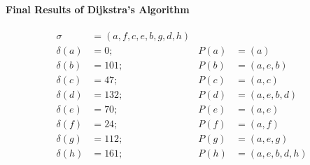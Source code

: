 \documentclass[10pt,]{book}
\theoremstyle{plain}
\theoremstyle{definition}
\theoremstyle{definition}
\theoremstyle{definition}
\theoremstyle{definition}
\numberwithin{equation}{section}
\newcommand{\amp}{&}
\begin{document}
\paragraph[{Final Results of Dijkstra's Algorithm}]{Final Results of Dijkstra's Algorithm}\hypertarget{paragraphs-8}{}
\hypertarget{p-222}{}%
%
\begin{align*}
\sigma\amp=(a,f,c,e,b,g,d,h)\\
\delta(a)\amp=0; \amp P(a)\amp=(a)\\
\delta(b)\amp=101; \amp P(b)\amp=(a,e,b)\\
\delta(c)\amp=47; \amp P(c)\amp=(a,c)\\
\delta(d)\amp= 132; \amp P(d)\amp=(a,e,b,d)\\
\delta(e)\amp=70; \amp P(e)\amp=(a,e)\\
\delta(f)\amp=24; \amp P(f)\amp=(a,f)\\
\delta(g)\amp=112; \amp P(g)\amp=(a,e,g)\\
\delta(h)\amp=161; \amp P(h)\amp=(a,e,b,d,h)
\end{align*}
%
\typeout{************************************************}
\typeout{************************************************}
\end{document}
